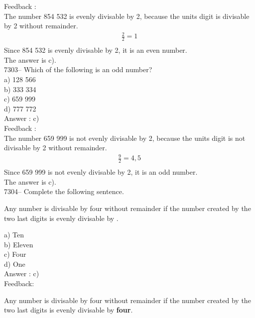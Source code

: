 \documentclass[letterpaper, 12pt]{article}
\begin{document}
Feedback :\\
The number 854 532 is evenly divisable by 2, because the units digit is divisable by 2 without remainder.\\
\begin{eqnarray*}
\frac{2}{2}=1\\
\end{eqnarray*}
Since 854 532 is evenly divisable by 2, it is an even number.\\
The answer is c).\\




7303-- Which of the following is an odd number?\\

a) 128 566\\
b) 333 334\\
c) 659 999\\
d) 777 772\\

Answer : c)\\

Feedback :\\
The number 659 999 is not evenly divisable by 2, because the 
units digit is not divisable by 2 without remainder.\\
\begin{eqnarray*}
\frac{9}{2}=4,5\\
\end{eqnarray*}
Since 659 999 is not evenly divisable by 2, it is an odd number.\\
The answer is c).\\

7304-- Complete the following sentence.\\
\begin{center}
Any number is divisable by four without remainder if the number 
created by the two last digits is evenly divisable by  \underline{\quad\quad}.\\
\end{center}

a) Ten\\
b) Eleven\\
c) Four\\
d) One\\

Answer : c)\\

Feedback:\\
\begin{center}
Any number is divisable by four without remainder if the number created by the two last digits is evenly divisable by \textbf{four}.\\
\end{center}
\end{document}
